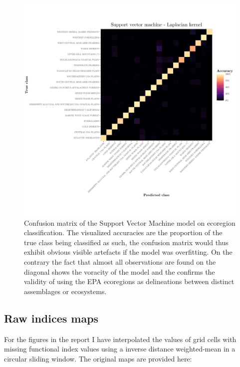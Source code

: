 \documentclass[
  10pt,
]{article}
\begin{document}
\begin{figure}[!h]
  \centering
  \includegraphics{../Ecosystem discrimination/SVM_confusion_matrix.png}
  \caption{Confusion matrix of the Support Vector Machine model on ecoregion classification. The visualized accuracies are the proportion of the true class being classified as such, the confusion matrix would thus exhibit obvious visible artefacts if the model was overfitting. On the contrary the fact that almost all observations are found on the diagonal shows the voracity of the model and the confirms the validity of using the EPA ecoregions as delineations between distinct assemblages or ecosystems.}
\end{figure}

\newpage

\hypertarget{appendixMaps}{%
\subsection{Raw indices maps}\label{appendixMaps}}

For the figures in the report I have interpolated the values of grid cells with missing functional index values using a inverse distance weighted-mean in a circular sliding window. The original maps are provided here:
\end{document}
